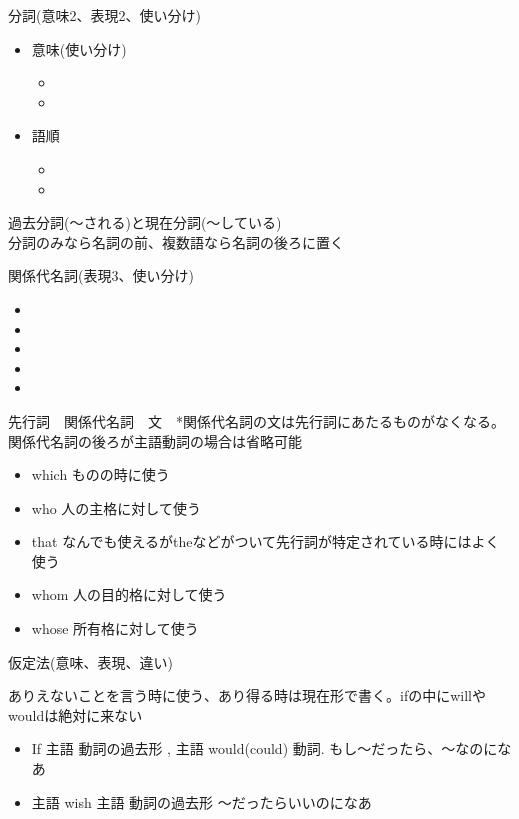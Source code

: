 \documentclass[10pt]{jsarticle}
\newcommand{\answer}[2]{{\color{orange}#2}}
\newcommand{\answer}[2]{\vspace{#1mm}}
\begin{document}
\begin{itembox}[l]{分詞(意味2、表現2、使い分け)}
	\begin{itemize}
		\item 意味(使い分け)
		      \begin{itemize}
			      \item \item
		      \end{itemize}
		\item 語順
		      \begin{itemize}
			      \item \item
		      \end{itemize}
	\end{itemize}
	\answer{0}{過去分詞(〜される)と現在分詞(〜している)\\
		分詞のみなら名詞の前、複数語なら名詞の後ろに置く}
\end{itembox}

\begin{itembox}[l]{関係代名詞(表現3、使い分け)}
	\begin{itemize}
		\item\item\item\item\item
	\end{itemize}
	\answer{0}{
		先行詞　関係代名詞　文　*関係代名詞の文は先行詞にあたるものがなくなる。\\
		関係代名詞の後ろが主語動詞の場合は省略可能
		\begin{itemize}
			\item which  ものの時に使う
			\item who 人の主格に対して使う
			\item that なんでも使えるがtheなどがついて先行詞が特定されている時にはよく使う
			\item whom 人の目的格に対して使う
			\item whose 所有格に対して使う
		\end{itemize}
	}
\end{itembox}

\begin{itembox}[l]{仮定法(意味、表現、違い)}
	\answer{10}{
		ありえないことを言う時に使う、あり得る時は現在形で書く。ifの中にwillやwouldは絶対に来ない
		\begin{itemize}
			\item If 主語 動詞の過去形 , 主語 would(could) 動詞. もし〜だったら、〜なのになあ
			\item 主語 wish 主語 動詞の過去形  〜だったらいいのになあ
		\end{itemize}
	}
\end{itembox}
\end{document}
